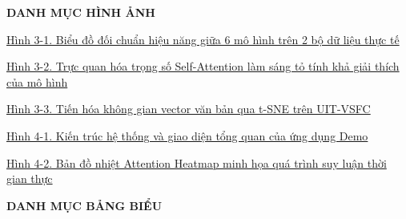 \documentclass[12pt,a4paper]{article}
\begin{document}
\newpage
{}
\setcounter{page}{1}
\label{page:danh_muc_hinh}

\begin{center}
    {\large\bfseries DANH MỤC HÌNH ẢNH}
\end{center}
\vspace{0.8cm}

\noindent\hyperref[fig:cross_comp_chart]{Hình 3-1. Biểu đồ đối chuẩn hiệu năng giữa 6 mô hình trên 2 bộ dữ liệu thực tế \dotfill \pageref*{fig:cross_comp_chart}}\par\vspace{6pt}
\noindent\hyperref[fig:attention_heatmaps]{Hình 3-2. Trực quan hóa trọng số Self-Attention làm sáng tỏ tính khả giải thích của mô hình \dotfill \pageref*{fig:attention_heatmaps}}\par\vspace{6pt}
\noindent\hyperref[fig:tsne_vis]{Hình 3-3. Tiến hóa không gian vector văn bản qua t-SNE trên UIT-VSFC \dotfill \pageref*{fig:tsne_vis}}\par\vspace{6pt}
\noindent\hyperref[fig:demo_architecture]{Hình 4-1. Kiến trúc hệ thống và giao diện tổng quan của ứng dụng Demo \dotfill \pageref*{fig:demo_architecture}}\par\vspace{6pt}
\noindent\hyperref[fig:demo_heatmap]{Hình 4-2. Bản đồ nhiệt Attention Heatmap minh họa quá trình suy luận thời gian thực \dotfill \pageref*{fig:demo_heatmap}}\par

\newpage
\label{page:danh_muc_bang}

\begin{center}
    {\large\bfseries DANH MỤC BẢNG BIỂU}
\end{center}
\vspace{0.8cm}
\end{document}
